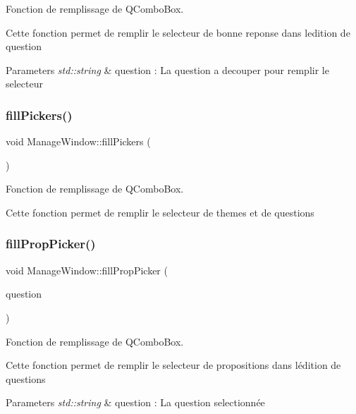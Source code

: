 Fonction de remplissage de Q\+Combo\+Box. 

Cette fonction permet de remplir le selecteur de bonne reponse dans l\textquotesingle{}edition de question 
\begin{DoxyParams}{Parameters}
{\em std\+::string} & question \+: La question a decouper pour remplir le selecteur \\
\hline
\end{DoxyParams}
\mbox{\label{classManageWindow_a746f794bbc9b2aa007fc4ccd2a8504d8}} 
\subsubsection{\texorpdfstring{fill\+Pickers()}{fillPickers()}}
{\footnotesize\ttfamily void Manage\+Window\+::fill\+Pickers (\begin{DoxyParamCaption}{ }\end{DoxyParamCaption})}



Fonction de remplissage de Q\+Combo\+Box. 

Cette fonction permet de remplir le selecteur de themes et de questions \mbox{\label{classManageWindow_a08c2bb9ab812720b59794f4eaeb2156b}} 
\subsubsection{\texorpdfstring{fill\+Prop\+Picker()}{fillPropPicker()}}
{\footnotesize\ttfamily void Manage\+Window\+::fill\+Prop\+Picker (\begin{DoxyParamCaption}\item[{string}]{question }\end{DoxyParamCaption})}



Fonction de remplissage de Q\+Combo\+Box. 

Cette fonction permet de remplir le selecteur de propositions dans l\textquotesingle{}édition de questions 
\begin{DoxyParams}{Parameters}
{\em std\+::string} & question \+: La question selectionnée \\
\hline
\end{DoxyParams}
\mbox{\label{classManageWindow_a1ce0be0aaeb2a8809004aa6a0316c6b9}} 
